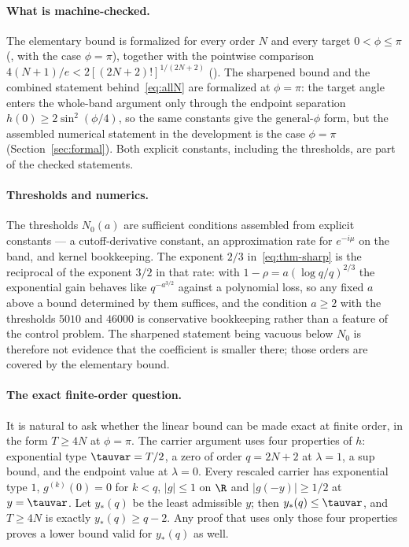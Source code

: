 \paragraph{What is machine-checked.} The elementary bound is formalized for every order
$N$ and every target $0<\phi\le\pi$ (, with
 the case $\phi=\pi$), together with the pointwise
comparison $4(N+1)/e<2[(2N+2)!]^{1/(2N+2)}$
(). The sharpened bound and the combined statement
 behind~\eqref{eq:allN} are formalized at $\phi=\pi$: the
target angle enters the whole-band argument only through the endpoint separation
$h(0)\ge2\sin^{2}(\phi/4)$, so the same constants give the general-$\phi$ form, but the
assembled numerical statement in the development is the case $\phi=\pi$
(Section~\ref{sec:formal}). Both explicit constants, including the thresholds, are part
of the checked statements.

\paragraph{Thresholds and numerics.} The thresholds $N_0(a)$ are sufficient conditions
assembled from explicit constants --- a cutoff-derivative constant, an approximation rate
for $e^{-i\mu}$ on the band, and kernel bookkeeping. The exponent $2/3$ in~\eqref{eq:thm-sharp} is the reciprocal of the exponent $3/2$ in that rate: with
$1-\rho=a(\log q/q)^{2/3}$ the exponential gain behaves like $q^{-a^{3/2}}$ against a
polynomial loss, so any fixed $a$ above a bound determined by them
suffices, and the condition $a\ge2$ with the thresholds $5010$ and $46000$ is conservative
bookkeeping rather than a feature of the control problem. The sharpened statement being
vacuous below $N_0$ is therefore not evidence that the coefficient is smaller there;
those orders are covered by the elementary bound.

\paragraph{The exact finite-order question.} It is natural to ask whether the linear
bound can be made exact at finite order, in the form $T\ge4N$ at $\phi=\pi$. The carrier argument uses four properties of $h$:
exponential type $\tauvar=T/2$, a zero of order $q=2N+2$ at $\lambda=1$, a sup bound, and
the endpoint value at $\lambda=0$. Every rescaled carrier has exponential type $1$, $g^{(k)}(0)=0$ for $k<q$, $\lvert g\rvert\le1$ on $\R$ and $\lvert g(-y)\rvert\ge1/2$ at $y=\tauvar$. Let $y_*(q)$ be the least admissible $y$; then $y_*(q)\le\tauvar$, and $T\ge4N$ is exactly $y_*(q)\ge q-2$. Any proof that uses only those four properties proves a lower bound
valid for $y_*(q)$ as well.

